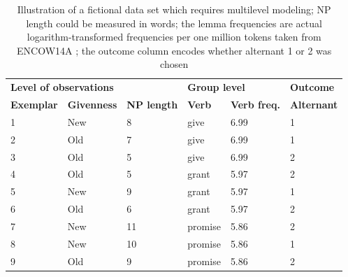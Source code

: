 \begin{table}
  \centering
  \begin{tabular}{llllll}
    \toprule
    \multicolumn{3}{l}{\textbf{Level of observations}}          & \multicolumn{2}{l}{\textbf{Group level}}  & \textbf{Outcome} \\
    \textbf{Exemplar} & \textbf{Givenness} & \textbf{NP length} & \textbf{Verb} & \textbf{Verb freq.}       & \textbf{Alternant}\\
    \midrule
            1 &     New   &      8    &    give   &   6.99   & 1 \\
            2 &     Old   &      7    &    give   &   6.99   & 1 \\
            3 &     Old   &      5    &    give   &   6.99   & 2 \\
            4 &     Old   &      5    &    grant  &   5.97   & 2 \\
            5 &     New   &      9    &    grant  &   5.97   & 1 \\
            6 &     Old   &      6    &    grant  &   5.97   & 2 \\
            7 &     New   &      11   &   promise &   5.86   & 2 \\
            8 &     New   &      10   &   promise &   5.86   & 1 \\
            9 &     Old   &      9    &   promise &   5.86   & 2 \\
    \bottomrule
  \end{tabular}
  \caption{Illustration of a fictional data set which requires multilevel modeling; NP length could be measured in words; the lemma frequencies are actual logarithm-transformed frequencies per one million tokens taken from ENCOW14A \citep{SchaeferBildhauer2012}; the outcome column encodes whether alternant 1 or 2 was chosen}
  \label{tab:multilevel}
\end{table}

